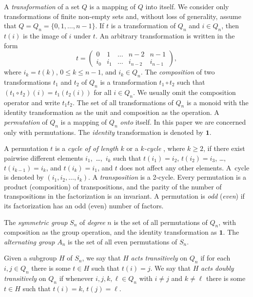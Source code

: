 \documentclass{llncs}
\newcommand{\one}{{\mathbf 1}}
\begin{document}
A {\em transformation} of a set $Q$ is a mapping of $Q$ into itself. 
We consider only transformations of finite non-empty sets and, 
without loss of generality, assume that $Q=Q_n = \{0,1,\dots, n-1\}$. If $t$ is a transformation of $Q_n$
and  $i \in Q_n$, then $t(i)$ is the image of $i$ under $t$.  
An arbitrary transformation is written in the form
\begin{equation*}\label{eq:transmatrix}
t=\left( \begin{array}{ccccc}
0 & 1 &   \dots &  n-2 & n-1 \\
i_0 & i_1 &   \dots &  i_{n-2} & i_{n-1}
\end{array} \right),
\end{equation*}
where $i_k = t(k)$, $0\le k\le n-1$, and $i_k\in Q_n$. 
The {\em composition} of two transformations $t_1$ and $t_2$ of $Q_n$ is a transformation $t_1 \circ t_2$ such that $(t_1 \circ t_2)(i)= t_1( t_2(i))$ for all $i \in Q_n$. We usually omit the composition operator and write $t_1t_2$. 
The set of all transformations of $Q_n$ is a monoid with the identity transformation as the unit and composition as the operation.
A \emph{permutation} of $Q_n$ is a mapping of $Q_n$ \emph{onto} itself. 
In this paper we are concerned only with permutations.
The \emph{identity} transformation is denoted by $\one$.

A permutation $t$ is a \emph{cycle of of length $k$} or a  \emph{$k$-cycle} , where $k \ge 2$, if there exist pairwise different elements $i_1$,~\dots,~$i_k$ such that
$t(i_1)=i_2$, $t(i_2)=i_3$, \dots, $t(i_{k-1})=i_k$, and $t(i_k)=i_1$, and $t$ does not affect any other elements.
A~cycle is denoted by $(i_1,i_2,\dots,i_k)$.
A \emph{transposition} is a 2-cycle.  
Every permutation is a product (composition) of transpositions, and the parity of the number of transpositions in the factorization is an invariant. A permutation is \emph{odd} (\emph{even}) if its factorization has an odd (even) number of factors.

The \emph{symmetric group} $S_n$ of \emph{degree} $n$ is the set of all permutations of $Q_n$, with composition as the group operation, and the identity transformation as $\one$.
The \emph{alternating group} $A_n$ is the set of all even permutations of $S_n$.

Given a subgroup $H$ of $S_n$, we say that $H$ \emph{acts transitively} on $Q_n$ if for each $i,j\in Q_n$ there is some $t\in H$ such that $t(i)=j$.  We say that $H$ \emph{acts doubly transitively} on $Q_n$ if whenever $i,j,k,\ell\in Q_n$ with $i\neq j$ and $k\neq \ell$ there is some $t\in H$ such that $t(i)=k$, $t(j)=\ell$.  
\end{document}
